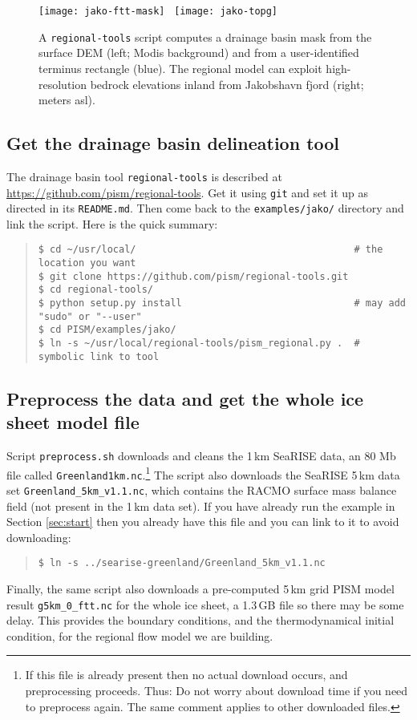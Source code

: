 \begin{figure}[ht]
  \centering
  \texttt{[image: jako-ftt-mask]} \, \texttt{[image: jako-topg]}
  \caption{A \texttt{regional-tools} script computes a drainage basin mask from the surface DEM (left; Modis background) and from a user-identified terminus rectangle (blue).  The regional model can exploit high-resolution bedrock elevations inland from Jakobshavn fjord (right; meters asl).}
  \label{fig:jako-basin-topg}
\end{figure}


\subsection*{Get the drainage basin delineation tool}
The drainage basin tool \texttt{regional-tools} is described at \url{https://github.com/pism/regional-tools}.  Get it using \texttt{git} and set it up as directed in its \texttt{README.md}.  Then come back to the \texttt{examples/jako/} directory and link the script.  Here is the quick summary:
\begin{quote}\small
\begin{verbatim}
$ cd ~/usr/local/                                      # the location you want
$ git clone https://github.com/pism/regional-tools.git
$ cd regional-tools/
$ python setup.py install                              # may add "sudo" or "--user"
$ cd PISM/examples/jako/
$ ln -s ~/usr/local/regional-tools/pism_regional.py .  # symbolic link to tool
\end{verbatim}
\normalsize\end{quote}

\subsection*{Preprocess the data and get the whole ice sheet model file}
Script \texttt{preprocess.sh} downloads and cleans the 1\,km SeaRISE data, an 80 Mb file called \texttt{Greenland1km.nc}.\footnote{If this file is already present then no actual download occurs, and preprocessing proceeds.  Thus:  Do not worry about download time if you need to preprocess again.  The same comment applies to other downloaded files.}  The script also downloads the SeaRISE 5\,km data set \texttt{Greenland_5km_v1.1.nc}, which contains the RACMO surface mass balance field (not present in the 1\,km data set).  If you have already run the example in Section \ref{sec:start} then you already have this file and you can link to it to avoid downloading:
\begin{quote}\small
\begin{verbatim}
$ ln -s ../searise-greenland/Greenland_5km_v1.1.nc
\end{verbatim}
\normalsize\end{quote}
Finally, the same script also downloads a pre-computed 5\,km grid PISM model result \texttt{g5km_0_ftt.nc} for the whole ice sheet, a 1.3\,GB file so there may be some delay.  This provides the boundary conditions, and the thermodynamical initial condition, for the regional flow model we are building.

